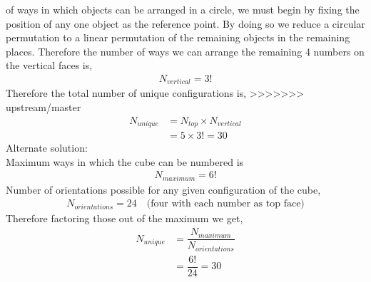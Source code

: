 \begin{solution}[\halfpage]
  of ways in which objects can be arranged in a circle, we must begin by 
  fixing the position of any one object as the reference point.
  By doing so we reduce a circular permutation to a linear permutation of the
  remaining objects in the remaining places. Therefore the number of ways we
  can arrange the remaining 4 numbers on the vertical faces is,
  \begin{align}
     N_{vertical} = 3! \nonumber
  \end{align}
  Therefore the total number of unique configurations is,
>>>>>>> upstream/master
  \begin{align}
    N_{unique} &= N_{top} \times N_{vertical} \nonumber \\
               &= 5 \times 3! = 30 \nonumber 
  \end{align}
  Alternate solution:\\
  Maximum ways in which the cube can be numbered is 
  \begin{align}
    N_{maximum} = 6! \nonumber
  \end{align}
  Number of orientations possible for any given configuration of the cube,
  \begin{align}
    N_{orientations} = 24 \quad\text{(four with each number as top face)} \nonumber
  \end{align}
  Therefore factoring those out of the maximum we get,
  \begin{align}
    N_{unique} &= \dfrac{N_{maximum}}{N_{orientations}} \nonumber \\
               &= \dfrac{6!}{24} = 30 \nonumber
  \end{align}   
\end{solution}

